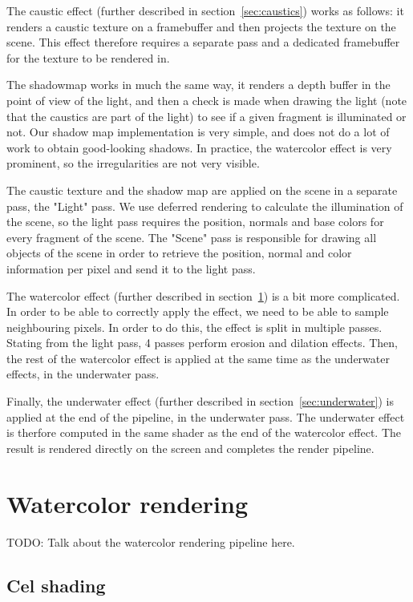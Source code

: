 \documentclass{article}
\begin{document}
The caustic effect (further described in section~\ref{sec:caustics}) works as follows: it renders a caustic texture on a framebuffer and then projects the texture on the scene. This effect therefore requires a separate pass and a dedicated framebuffer for the texture to be rendered in.

The shadowmap works in much the same way, it renders a depth buffer in the point of view of the light, and then a check is made when drawing the light (note that the caustics are part of the light) to see if a given fragment is illuminated or not. Our shadow map implementation is very simple, and does not do a lot of work to obtain good-looking shadows. In practice, the watercolor effect is very prominent, so the irregularities are not very visible.

The caustic texture and the shadow map are applied on the scene in a separate pass, the "Light" pass. We use deferred rendering to calculate the illumination of the scene, so the light pass requires the position, normals and base colors for every fragment of the scene. The "Scene" pass is responsible for drawing all objects of the scene in order to retrieve the position, normal and color information per pixel and send it to the light pass.

The watercolor effect (further described in section~\ref{sec:watercolor}) is a bit more complicated. In order to be able to correctly apply the effect, we need to be able to sample neighbouring pixels. In order to do this, the effect is split in multiple passes. Stating from the light pass, 4 passes perform erosion and dilation effects. Then, the rest of the watercolor effect is applied at the same time as the underwater effects, in the underwater pass.

Finally, the underwater effect (further described in section~\ref{sec:underwater}) is applied at the end of the pipeline, in the underwater pass. The underwater effect is therfore computed in the same shader as the end of the watercolor effect. The result is rendered directly on the screen and completes the render pipeline.


\newpage
\section{Watercolor rendering}
\label{sec:watercolor}

TODO: Talk about the watercolor rendering pipeline here.

\subsection{Cel shading}
\end{document}
